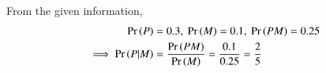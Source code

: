 From the given information,
\begin{align}
	\Pr\left(P\right)&=0.3,\
\Pr\left(M\right)=0.1,\
\Pr\left(PM\right)=0.25\\
\implies 
\Pr\left(P|M\right)&=\frac{\Pr\left(PM\right)}{\Pr\left(M\right)}
        =\frac{0.1}{0.25}
        =\frac{2}{5}
        \end{align}

